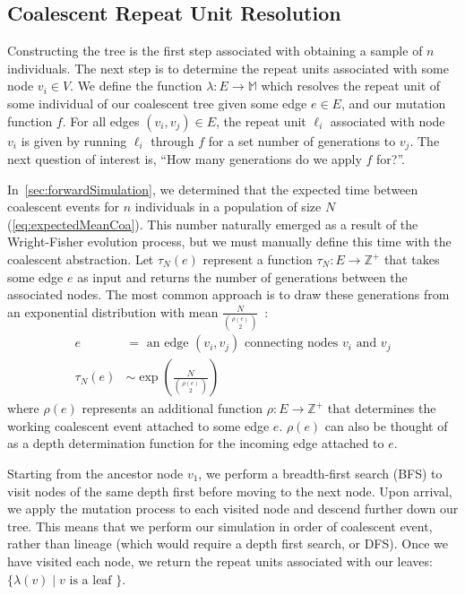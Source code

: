 \subsection{Coalescent Repeat Unit Resolution}\label{subsec:coalescentRepeatLengthResolution}
Constructing the tree is the first step associated with obtaining a sample of $n$ individuals.
The next step is to determine the repeat units associated with some node $v_i \in V$.
We define the function $\lambda : E \rightarrow \mathbb{M}$ which resolves the repeat unit of some
individual of our coalescent tree given some edge $e \in E$, and our mutation function $f$.
For all edges $(v_i, v_j) \in E$, the repeat unit $\ell_i$ associated with node $v_i$ is given by running
$\ell_i$ through $f$ for a set number of generations to $v_j$.
The next question of interest is, ``How many generations do we apply $f$ for?''.

In~\autoref{sec:forwardSimulation}, we determined that the expected time between coalescent events for $n$ individuals
in a population of size $N$ (\autoref{eq:expectedMeanCoa}).
This number naturally emerged as a result of the Wright-Fisher evolution process, but we must manually define this time
with the coalescent abstraction.
Let $\tau_N(e)$ represent a function $\tau_N : E \rightarrow \mathbb{Z}^+$ that takes some edge $e$ as input and returns
the number of generations between the associated nodes.
The most common approach is to draw these generations from an exponential distribution with mean
$\frac{N}{\binom{\rho(e)}{2}}$~\cite{hudsonGeneGenealogiesCoalescent1990}:
\begin{align}
    e &= \text{ an edge } (v_i, v_j) \text{ connecting nodes } v_i \text{ and } v_j \\
    \tau_N(e) &\sim \exp\left(\frac{N}{\binom{\rho(e)}{2}}\right)
\end{align}
where $\rho(e)$ represents an additional function $\rho : E \rightarrow \mathbb{Z}^+$ that determines the working coalescent
event attached to some edge $e$.
$\rho(e)$ can also be thought of as a depth determination function for the incoming edge attached to $e$.

Starting from the ancestor node $v_1$, we perform a breadth-first search (BFS) to visit nodes of the same depth first
before moving to the next node.
Upon arrival, we apply the mutation process to each visited node and descend further down our tree.
This means that we perform our simulation in order of coalescent event, rather than lineage (which would require a
depth first search, or DFS).
Once we have visited each node, we return the repeat units associated with our leaves: $\{ \lambda (v) \mid v
\text{ is a leaf }\}$.

